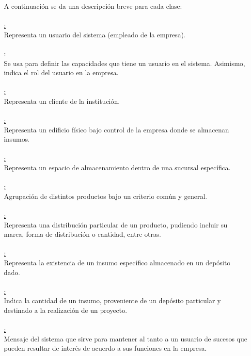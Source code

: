 \documentclass[a4paper, 12pt,twoside]{report}  %
\numberwithin{equation}{subsection} %
\begin{document}
A continuación se da una descripción breve para cada clase:\\\\
\underline{:}\\
Representa un usuario del sistema (empleado de la empresa).\\
\\
\underline{:}\\
Se usa para definir las capacidades que tiene un usuario en el sistema. Asimismo, indica el rol del usuario en la empresa.\\
\\
\underline{:}\\
Representa un cliente de la institución.\\
\\
\underline{:}\\
Representa un edificio físico bajo control de la empresa donde se almacenan insumos.\\
\\
\underline{:}\\
Representa un espacio de almacenamiento dentro de una sucursal específica.\\
\\
\underline{:}\\
Agrupación de distintos productos bajo un criterio común y general.\\
\\
\underline{:}\\
Representa una distribución particular de un producto, pudiendo incluir su marca, forma de distribución o cantidad, entre otras.\\
\\
\underline{:}\\
Representa la existencia de un insumo específico almacenado en un depósito dado.\\
\\
\underline{:}\\
Indica la cantidad de un insumo, proveniente de un depósito particular y destinado a la realización de un proyecto.\\
\\
\underline{:}\\
Mensaje del sistema que sirve para mantener al tanto a un usuario de sucesos que pueden resultar de interés de acuerdo a sus funciones en la empresa.\\
\\
\end{document}
